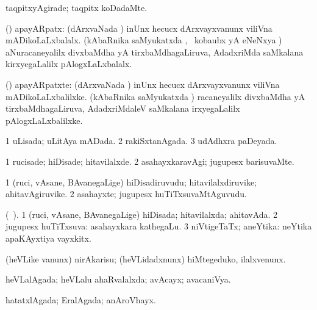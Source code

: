 \bentry
{} 
\gl{\kirxvi}
\expl{}
\bmng
taqpitxyAgirade; taqpitx koDadaMte. 
\emng
\eentry

\bentry
{} 
\gl{\gu}
\expl{}
\bmng
(\ravi) apayARpatx: 
\banum
{} (dArxvaNada \vi) inUnx hecucx dArxvayxvanunx viliVna mADikoLaLxbalalx. 
 (kAbaRnika saMyukatxda \vi, \kanmu\ kobaubx yA eNeNxya \vi) aNuracaneyalilx divxbaMdha yA tirxbaMdhagaLiruva, AdadxriMda saMkalana kirxyegaLalilx pAlogxLaLxbalalx. 
\eanum
\emng
\eentry

\bentry
{} 
\gl{\nA}
\expl{}
\bmng
(\ravi) apayARpatxte: 
\banum
{} (dArxvaNada \vi) inUnx hecucx dArxvayxvanunx viliVna mADikoLaLxbalilxke. 
 (kAbaRnika saMyukatxda \vi) racaneyalilx divxbaMdha yA tirxbaMdhagaLiruva, AdadxriMdaleV saMkalana irxyegaLalilx pAlogxLaLxbalilxke. 
\eanum
\emng
\eentry

\bentry
{} 
\gl{\gu}
\expl{}
\bmng
\bnum
\num{1} uLisada; uLitAya mADada. 
\num{2} rakiSxtanAgada. 
\num{3} udAdhxra paDeyada. 
\enum
\emng
\eentry

\bentry
{} 
\gl{\kirxvi}
\expl{}
\bmng
\bnum
\num{1} rucisade; hiDisade; hitavilalxde. 
\num{2} asahayxkaravAgi; jugupesx barisuvaMte. 
\enum
\emng
\eentry

\bentry
{} 
\gl{\nA}
\expl{}
\bmng
\bnum
\num{1} (ruci, vAsane, BAvanegaLige) hiDisadiruvudu; hitavilalxdiruvike; ahitavAgiruvike. 
\num{2} asahayxte; jugupesx huTiTxsuvaMtAguvudu. 
\enum
\emng
\eentry

\bentry
{} 
\gl{\gu}
\expl{}
\bmng
(\ame\ ). 
\bnum
\num{1} (ruci, vAsane, BAvanegaLige) hiDisada; hitavilalxda; ahitavAda. 
\num{2} jugupesx huTiTxsuva:  asahayxkara kathegaLu. 
\num{3} niVtigeTaTx; aneYtika:  neYtika apaKAyxtiya vayxkitx. 
\enum
\emng
\eentry

\bentry
{} 
\gl{\akirx}
\bmng
(heVLike \mo vanunx) nirAkarisu; (heVLidadxnunx) hiMtegeduko, ilalxvenunx. 
\emng
\eentry

\bentry
{} 
\gl{\gu}
\expl{}
\bmng
heVLalAgada; heVLalu ahaRvalalxda; avAcayx; avacaniVya. 
\emng
\eentry

\bentry
{} 
\gl{\gu}
\expl{}
\bmng
hatatxlAgada; EralAgada; anAroVhayx. 
\emng
\eentry

